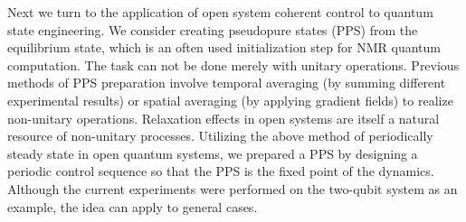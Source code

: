 \documentclass[prl,aps,twocolumn, reprint, amsmath,amssymb,showpacs,superscriptaddress]{revtex4}
\begin{document}
Next we turn to the application of open system coherent control to quantum state engineering.
We consider creating pseudopure states (PPS) \cite{CPH, GC, KCL} from the equilibrium state, which is  an often used initialization step for NMR quantum computation. The task can not be done merely with unitary operations. Previous methods of PPS preparation  \cite{PPS} involve temporal averaging (by summing different experimental results) or spatial averaging (by applying gradient fields) to realize non-unitary operations.  Relaxation effects in open systems are itself a natural  resource of non-unitary processes.  Utilizing the above method of periodically steady state in open quantum systems, we prepared a PPS by designing a periodic control sequence so that the PPS is the fixed point of the dynamics. Although the current experiments were performed on the two-qubit system as an example, the idea can apply to general cases.
\end{document}
